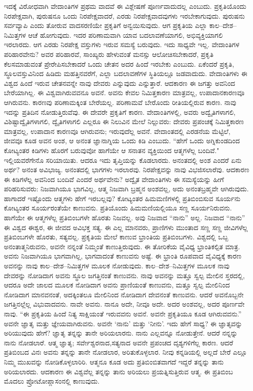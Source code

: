 ಇದಕ್ಕೆ ವಿರೋಧವಾಗಿ ವೇದಾಂತಿಗಳ ಪ್ರಥಮ ವಾದವೆ ಈ ವಿಶ್ಲೇಷಣೆ ಪೂರ್ಣವಾದುದಲ್ಲ ಎಂಬುದು. ಪ್ರಕೃತಿಯೊಂದು ನಿರಪೇಕ್ಷವಾಗಿ, ಪುರುಷನೂ ಒಂದು ನಿರಪೇಕ್ಷವಾದರೆ, ಎರಡು ನಿರಪೇಕ್ಷವಾದವುಗಳು ಇರಬೇಕಾಗುವುದು. ಪುರುಷನು ಸರ್ವವ್ಯಾಪಿ ಎಂದು ತೋರುವ ವಾದಸರಣಿಯೇ ಪ್ರಕೃತಿಗೆ ಅನ್ವಯಿಸುವುದು. ಆಗ ಪ್ರಕೃತಿಯ ಎಲ್ಲಾ ಕಾಲ–ದೇಶ–ನಿಮಿತ್ತಗಳ ಆಚೆ ಹೋಗುವುದು. ಇದರ ಪರಿಣಾಮವಾಗಿ ಯಾವ ಬದಲಾವಣೆಯಾಗಲಿ, ಅಭಿವ್ಯಕ್ತಿಯಾಗಲಿ ಇರಲಾರದು. ಆಗ ಎರಡು ನಿರಪೇಕ್ಷ ವಸ್ತುಗಳು ಇರುವ ಸಮಸ್ಯೆ ಬರುವುದು. ಇದು ಸಾಧ್ಯವೇ ಇಲ್ಲ. ವೇದಾಂತಿಗಳ ಪರಿಹಾರವೇನು? ಅವರ ಪರಿಹಾರವೆ, ಸಾಂಖ್ಯರು ಹೇಳುವಂತೆ ಮನಸ್ಸು ಆಲೋಚಿಸಬೇಕಾದರೆ, ಪ್ರಕೃತಿ ಕೆಲಸಮಾಡುವಂತೆ ಪ್ರೇರೇಪಿಸಬೇಕಾದರೆ ಒಂದು ಚೇತನ ಅದರ ಹಿಂದೆ ಇರಬೇಕು ಎಂಬುದು. ಏಕೆಂದರೆ ಪ್ರಕೃತಿ, ಸ್ಥೂಲವಸ್ತುವಿನಿಂದ ಹಿಡಿದು ಮಹತ್ತಿನವರೆಗೆ, ಎಲ್ಲಾ ಬದಲಾವಣೆಗಳ ಸ್ಥಿತಿಯಲ್ಲೂ ಜಡವಾದುದು. ವೇದಾಂತಿಗಳು ಈ ವಿಶ್ವದ ಹಿಂದೆ ಇರುವ ಚೇತನವನ್ನೇ ನಾವು ದೇವರು ಎನ್ನುವುದು ಎನ್ನುತ್ತಾರೆ. ಆದಕಾರಣ ಈ ಜಗತ್ತು ಅವನಿಂದ ಬೇರೆಯಾಗಿಲ್ಲ. ಈ ವಿಶ್ವವಾಗಿರುವವನೂ ಅವನೆ. ಅವನು ಕೇವಲ ನಿಮಿತ್ತಕಾರಣ ಮಾತ್ರವಲ್ಲ, ಉಪಾದಾನಕಾರಣವೂ ಆಗಿರುವನು. ಕಾರಣವು ಪರಿಣಾಮಕ್ಕಿಂತ ಬೇರೆಯಲ್ಲ. ಪರಿಣಾಮವೆ ಬೇರೊಂದು ರೀತಿಯಲ್ಲಿರುವ ಕಾರಣ. ನಾವು ಇದನ್ನು ಪ್ರತಿದಿನ ನೋಡುತ್ತಿರುವೆವು. ಈ ದೇವರೇ ಪ್ರಕೃತಿಗೆ ಕಾರಣ. ವೇದಾಂತಿಗಳಲ್ಲಿ, ಅವರು ಅದ್ವೈತಿಗಳಾಗಲಿ, ವಿಶಿಷ್ಟಾದ್ವೈತಿಗಳಾಗಲಿ, ದ್ವೈತಿಗಳಾಗಲಿ ಎಲ್ಲರೂ ಈ ನಿಲುವಿನ ಮೇಲೆ ನಿಲ್ಲುವರು: ದೇವರು ಪ್ರಪಂಚಕ್ಕೆ ನಿಮಿತ್ತಕಾರಣ ಮಾತ್ರವಲ್ಲ, ಉಪಾದಾನ ಕಾರಣವೂ ಆಗಿರುವನು; ಇರುವುದೆಲ್ಲ ಅವನೆ. ವೇದಾಂತದಲ್ಲಿ ಎರಡನೆಯ ಮೆಟ್ಟಿಲೆ, ಜೀವವೂ ಕೂಡ ಅವನ ಅಂಶ, ಆ ಅನಂತ ಜ್ಞಾನಾಗ್ನಿಯ ಒಂದು ಕಿಡಿ ಎಂಬುದು. “ಹೇಗೆ ಒಂದು ಅಗ್ನಿಕುಂಡದಿಂದ ಕೋಟ್ಯಂತರ ಕಿಡಿಗಳು ಹೊರಗೆ ಬರುವುವೋ ಹಾಗೆಯೇ ಆ ಸನಾತನ ವ್ಯಕ್ತಿಯಿಂದ ಆತ್ಮಗಳೆಲ್ಲ ಬಂದಿವೆ." ಇಲ್ಲಿಯವರೆಗೇನೊ ಸರಿಯಾಯಿತು. ಆದರೂ ಇದು ತೃಪ್ತಿಯನ್ನು ಕೊಡಲಾರದು. ಅನಂತದಲ್ಲಿ ಅಂಶ ಎಂದರೆ ಏನು ಅರ್ಥ? ಅನಂತ ಅವಿಭಾಜ್ಯ. ಅನಂತದಲ್ಲಿ ಭಾಗಗಳು ಇರಲಾರವು. ನಿರಪೇಕ್ಷವನ್ನು ನಾವು ವಿಭಜಿಸಲಾರೆವು. ಆದಕಾರಣ ಈ ಕಿಡಿಗಳೆಲ್ಲ ಅವನಿಂದ ಬಂದಿವೆ ಎಂದರೆ ಅರ್ಥವೇನು? ಅದ್ವೈತ ವೇದಾಂತಿಗಳು ಈ ಸಮಸ್ಯೆಯನ್ನು ಹೀಗೆ ಪರಿಹರಿಸುವರು: ನಿಜವಾಗಿಯೂ ಭಾಗವಿಲ್ಲ, ಆತ್ಮ ನಿಜವಾಗಿ ಬ್ರಹ್ಮನ ಅಂಶವಲ್ಲ, ಅದು ಅನಂತಬ್ರಹ್ಮವೇ ಆಗಿರುವುದು. ಹಾಗಾದರೆ ಇಷ್ಟೊಂದು ಆತ್ಮಗಳು ಹೇಗೆ ಇರಬಲ್ಲವು? ಕೋಟ್ಯಂತರ ಹಿಮಮಣಿಗಳಲ್ಲಿ ಪ್ರತಿಬಿಂಬಿಸುವ ಸೂರ್ಯನು ಕೋಟ್ಯಂತರ ಸೂರ್ಯರಂತೆಯೇ ಕಾಣುವನು. ಪ್ರತಿಯೊಂದು ಹಿಮಮಣಿಯಲ್ಲಿಯೂ ಸಣ್ಣ ಸೂರ್ಯನಿರುವನು. ಹಾಗೆಯೇ ಈ ಆತ್ಮಗಳೆಲ್ಲ ಪ್ರತಿಬಿಂಬಗಳೇ ಹೊರತು ನಿಜವಲ್ಲ. ಅವು ನಿಜವಾದ “ನಾನು'' ಅಲ್ಲ. ನಿಜವಾದ “ನಾನು'' ಈ ವಿಶ್ವದ ಈಶ್ವರ, ಈ ಜೀವದ ಅವಿಭಕ್ತ ಸತ್ಯ. ಈ ಎಲ್ಲ ಮಾನವರು, ಪ್ರಾಣಿಗಳು ಮುಂತಾದ ಸಣ್ಣ ಸಣ್ಣ ಜೀವಿಗಳೆಲ್ಲ ಪ್ರತಿಬಿಂಬಗಳೇ ಹೊರತು, ಸತ್ಯವಲ್ಲ. ಪ್ರಕೃತಿಯ ಮೇಲೆ ಕಾಣುವ ಭ್ರಾಂತಿಯ ಪ್ರತಿಬಿಂಬಗಳು. ವಿಶ್ವದಲ್ಲಿ ಒಬ್ಬ ಅನಂತಾತ್ಮನಿರುವನು, ಅವನೇ ನನ್ನಂತೆ ನಿಮ್ಮಂತೆ ಕಾಣುತ್ತಿರುವುದು. ಈ ತೋರಿಕೆಯ ವೈವಿಧ್ಯ ಭ್ರಾಂತಿಕಲ್ಪಿತ ಮಾತ್ರ. ಅವನು ನಿಜವಾಗಿಯೂ ಭಾಗವಾಗಿಲ್ಲ, ಭಾಗವಾದಂತೆ ಕಾಣುವನು ಅಷ್ಟೆ. ಈ ಭ್ರಾಂತಿ ರೂಪವಾದ ವೈವಿಧ್ಯಕ್ಕೆ ಕಾರಣ ಅವನನ್ನು ನಾವು ಕಾಲ–ದೇಶ–ನಿಮಿತ್ತಗಳ ಮೂಲಕ ನೋಡುವುದು. ಕಾಲ–ದೇಶ–ನಿಮಿತ್ತಗಳ ಮೂಲಕ ನಾವು ದೇವರನ್ನು ನೋಡಿದಾಗ ಅವನು ಸ್ಥೂಲ ಜಗತ್ತಿನಂತೆ ಕಾಣುವನು. ನಾವು ಅವನನ್ನು ಮತ್ತೂ ಸ್ವಲ್ಪ ಮೇಲಿನ ಸ್ತರದಲ್ಲಿ, ಆದರೂ ಅದೇ ಜಾಲದ ಮೂಲಕ ನೋಡಿದಾಗ ಅವನು ಪ್ರಾಣಿಯಂತೆ ಕಾಣುವನು, ಮತ್ತೂ ಸ್ವಲ್ಪ ಮೇಲಿನಿಂದ ನೋಡಿದಾಗ ಮಾನವನಂತೆ, ಅದಕ್ಕಿಂತಲೂ ಮೇಲಿನಿಂದ ನೋಡಿದಾಗ ದೇವನಂತೆ ಕಾಣುವನು. ಆದರೆ ಅವನೊಬ್ಬನೇ ಜಗತ್ತಿನಲ್ಲೆಲ್ಲ ವಿಭುವಾದವನು. ನಾವೇ ಅವನು. ನಾನೂ ಅದೇ, ನೀವೂ ಅದೇ. ಅದರ ಅಂಶವಲ್ಲ, ಅದರ ಪೂರ್ಣವೇ ನಾವು. “ಈ ಪ್ರಕೃತಿಯ ಹಿಂದೆ ನಿತ್ಯ ಸಾಕ್ಷಿಯಂತೆ ಇರುವವನು ಅವನೆ. ಅವನೇ ಪ್ರಕೃತಿಯೂ ಕೂಡ ಆಗಿರುವವನು.” ಅವನೇ ಜ್ಞಾತೃ ಮತ್ತು ಜ್ಞೇಯವಾಗಿರುವನು. ಅವನೇ `ನಾನು' ಮತ್ತು `ನೀನು'. ಇದು ಹೇಗೆ ಸಾಧ್ಯ? ಈ ಜ್ಞಾತೃವನ್ನು ಅರಿಯುವುದು ಹೇಗೆ? ಜ್ಞಾತೃ ತನ್ನನ್ನು ತಾನೇ ಅರಿಯಲಾರನು. ನಾನು ಎಲ್ಲವನ್ನೂ ನೋಡುತ್ತೇನೆ. ಆದರೆ ನನ್ನನ್ನು ನಾನು ನೋಡಲಾರೆ. ಆತ್ಮ ಜ್ಞಾತೃ; ಸರ್ವೇಶ್ವರನಾದ,\break ಸತ್ಯನಾದ ಅವನೇ ಪ್ರಪಂಚದ ದೃಶ್ಯಗಳಿಗೆಲ್ಲ ಕಾರಣ. ಆದರೆ ಪ್ರತಿಬಿಂಬದ ವಿನಃ ಅವನು ತನ್ನನ್ನು ತಾನೇ ನೋಡಲಾರ, ಅರಿತುಕೊಳ್ಳಲಾರ. ನೀವು ಕನ್ನಡಿಯಲ್ಲಿ ಅಲ್ಲದೆ ಬೇರೆ ಎಲ್ಲೂ ನಿಮ್ಮ ಮುಖವನ್ನು ನೋಡಿಕೊಳ್ಳಲಾರಿರಿ. ಆತ್ಮನೂ ಕೂಡ ಅದು ಪ್ರತಿಬಿಂಬಿತವಾಗದೆ ಇದ್ದರೆ ತನ್ನನ್ನು ತಾನು ಅರಿಯಲಾರದು. ಆದಕಾರಣ ಈ ವಿಶ್ವವೆಲ್ಲ ತನ್ನನ್ನು ತಾನು ಅರಿಯಲು ಪ್ರಯತ್ನಿಸುತ್ತಿರುವ ಆತ್ಮ. ಈ ಪ್ರತಿಬಿಂಬ ಮೊದಲು ಪ್ರೋಟೋಪ್ಲಾಸಂನಲ್ಲಿ ಕಾಣುವುದು. 